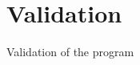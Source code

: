 \documentclass[c,8pt,xcolor...,x11names,usenames,dvipsnames]{beamer}
\begin{document}
\section{Validation}
\begin{frame}{Validation of the program}
\end{frame}
\end{document}
